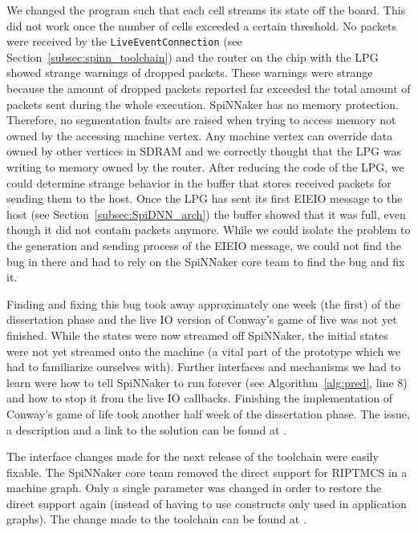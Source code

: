 \documentclass[]{article}
\begin{document}
We changed the program such that each cell streams its state off the
board.
This did not work once the number of cells exceeded
a certain threshold.
No packets were received by the \texttt{LiveEventConnection}
(see Section~\ref{subsec:spinn_toolchain}) and the router on the
chip with the LPG showed strange warnings of dropped packets.
These warnings were strange because the amount of dropped packets
reported far exceeded the total amount of packets sent during the
whole execution.
SpiNNaker has no memory protection.
Therefore, no segmentation faults are raised when
trying to access memory not owned by the accessing machine vertex.
Any machine vertex can override data owned by other vertices in SDRAM
and we correctly thought that the LPG was writing to memory owned by
the router.
After reducing the code of the LPG, we could determine strange
behavior in the buffer that stores received packets for sending them
to the host.
Once the LPG has sent its first EIEIO message to the host
(see Section~\ref{subsec:SpiDNN_arch}) the buffer showed that it was
full, even though it did not contain packets anymore.
While we could isolate the problem to the generation and sending
process of the EIEIO message, we could not find the bug in there
and had to rely on the SpiNNaker core team to find the bug and fix it.

Finding and fixing this bug took away approximately one week
(the first) of the dissertation phase and the live IO version of
Conway's game of live was not yet finished.
While the states were now streamed off SpiNNaker, the initial
states were not yet streamed onto the machine (a vital part of the
prototype which we had to familiarize ourselves with).
Further interfaces and mechanisms we had to learn were how to
tell SpiNNaker to run forever (see Algorithm~\ref{alg:pred}, line 8)
and how to stop it from the live IO callbacks.
Finishing the implementation of Conway's game of life took another
half week of the dissertation phase.
The issue, a description and a link to the solution can be found at
\citep{fassbender_2020a}.

The interface changes made for the next release of the toolchain
were easily fixable.
The SpiNNaker core team removed the direct support for RIPTMCS
in a machine graph.
Only a single parameter was changed in order to restore the direct
support again (instead of having to use constructs only used in
application graphs).
The change made to the toolchain can be found at
\citet{fassbender_2020b}.
\end{document}

